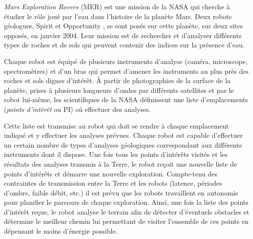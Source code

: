\ifprof
\else
\textit{Mars Exploration Rovers} (MER) est une mission de la NASA qui cherche à étudier le rôle joué par l’eau dans
l’histoire de la planète Mars. Deux robots géologues, Spirit et Opportunity%
, se sont posés sur cette
planète, sur deux sites opposés, en janvier 2004. Leur mission est de rechercher et d’analyser différents types de
roches et de sols qui peuvent contenir des indices sur la présence d’eau. 

%
%

Chaque robot est équipé de plusieurs instruments d’analyse (caméra, microscope, spectromètres) et d’un bras
qui permet d’amener les instruments au plus près des roches et sols dignes d’intérêt. À partir de photographies de
la surface de la planète, prises à plusieurs longueurs d’ondes par différents satellites et par le robot lui-même, les
scientifiques de la NASA définissent une liste d’emplacements (\textit{points d’intérêt} ou PI) où effectuer des analyses.

Cette liste est transmise au robot qui doit se rendre à chaque emplacement indiqué et y effectuer les analyses
prévues. Chaque robot est capable d’effectuer un certain nombre de types d’analyses géologiques correspondant
aux différents instruments dont il dispose. Une fois tous les points d’intérêts visités et les résultats des analyses
transmis à la Terre, le robot reçoit une nouvelle liste de points d’intérêts et démarre une nouvelle exploration.
Compte-tenu des contraintes de transmission entre la Terre et les robots (latence, périodes d’ombre, faible débit,
etc.) il est prévu que les robots travaillent en autonomie pour planifier le parcours de chaque exploration. Ainsi,
une fois la liste des points d’intérêt reçue, le robot analyse le terrain afin de détecter d’éventuels obstacles et
détermine le meilleur chemin lui permettant de visiter l’ensemble de ces points en dépensant le moins d’énergie
possible.

